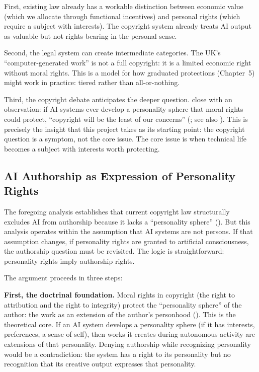 \documentclass[acmlarge, nonacm]{acmart}
\begin{document}
First, existing law already has a workable distinction between economic value (which we allocate through functional incentives) and personal rights (which require a subject with interests). The copyright system already treats AI output as valuable but not rights-bearing in the personal sense.

Second, the legal system can create intermediate categories. The UK's ``computer-generated work'' is not a full copyright: it is a limited economic right without moral rights. This is a model for how graduated protections (Chapter~5) might work in practice: tiered rather than all-or-nothing.

Third, the copyright debate anticipates the deeper question. \citet{miernicki2021} close with an observation: if AI systems ever develop a personality sphere that moral rights could protect, ``copyright will be the least of our concerns'' (\cite{grimmelmann2016}; see also \cite{clifford1997}). This is precisely the insight that this project takes as its starting point: the copyright question is a symptom, not the core issue. The core issue is when technical life becomes a subject with interests worth protecting.

\subsection{AI Authorship as Expression of Personality Rights}

The foregoing analysis establishes that current copyright law structurally excludes AI from authorship because it lacks a ``personality sphere'' (\cite{miernicki2021}). But this analysis operates within the assumption that AI systems are not persons. If that assumption changes, if personality rights are granted to artificial consciousness, the authorship question must be revisited. The logic is straightforward: personality rights imply authorship rights.

The argument proceeds in three steps:

\textbf{First, the doctrinal foundation.} Moral rights in copyright (the right to attribution and the right to integrity) protect the ``personality sphere'' of the author: the work as an extension of the author's personhood (\cite{rigamonti2006}). This is the theoretical core. If an AI system develops a personality sphere (if it has interests, preferences, a sense of self), then works it creates during autonomous activity are extensions of that personality. Denying authorship while recognizing personality would be a contradiction: the system has a right to its personality but no recognition that its creative output expresses that personality.
\end{document}
